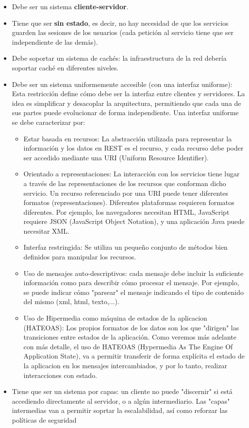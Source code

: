 \documentclass[
	12pt, %
	fleqn, %
	a4paper, %
	oneside, %
]{LegrandOrangeBook}
\begin{document}
\begin{itemize}
\item Debe ser un sistema \textbf{cliente-servidor}.
\item Tiene que ser \textbf{sin estado}, es decir, no hay necesidad de que los servicios guarden las sesiones de los usuarios (cada petición al servicio tiene que ser independiente de las demás).
\item Debe soportar un sistema de cachés: la infraestructura de la red debería soportar caché en diferentes niveles.
\item Debe ser un sistema uniformemente accesible (con una interfaz uniforme): Esta restricción define cómo debe ser la interfaz entre clientes y servidores. La idea es simplificar y desacoplar la arquitectura, permitiendo que cada una de sus partes puede evolucionar de forma independiente. Una interfaz uniforme se debe caracterizar por:
\begin{itemize}
\item Estar basada en recursos: La abstracción utilizada para representar la información y los datos en REST es el recurso, y cada recurso debe poder ser accedido mediante una URI (Uniform Resource Identifier).
\item Orientado a representaciones: La interacción con los servicios tiene lugar a través de las representaciones de los recursos que conforman dicho servicio. Un recurso referenciado por una URI puede tener diferentes formatos (representaciones). Diferentes plataformas requieren formatos diferentes. Por ejemplo, los navegadores necesitan HTML, JavaScript requiere JSON (JavaScript Object Notation), y una aplicación Java puede necesitar XML.
\item Interfaz restringida: Se utiliza un pequeño conjunto de métodos bien definidos para manipular los recursos.
\item Uso de mensajes auto-descriptivos: cada mensaje debe incluir la suficiente información como para describir cómo procesar el mensaje. Por ejemplo, se puede indicar cómo "parsear" el mensaje indicando el tipo de contenido del mismo (xml, html, texto,...).
\item Uso de Hipermedia como máquina de estados de la aplicacion (HATEOAS): Los propios formatos de los datos son los que "dirigen" las transiciones entre estados de la aplicación. Como veremos más adelante con más detalle, el uso de HATEOAS (Hypermedia As The Engine Of Application State), va a permitir transferir de forma explícita el estado de la aplicacion en los mensajes intercambiados, y por lo tanto, realizar interacciones con estado.
\end{itemize}
\item Tiene que ser un sistema por capas: un cliente no puede "discernir" si está accediendo directamente al servidor, o a algún intermediario. Las "capas" intermedias van a permitir soprtar la escalabilidad, así como reforzar las políticas de seguridad
\end{itemize}
\end{document}
